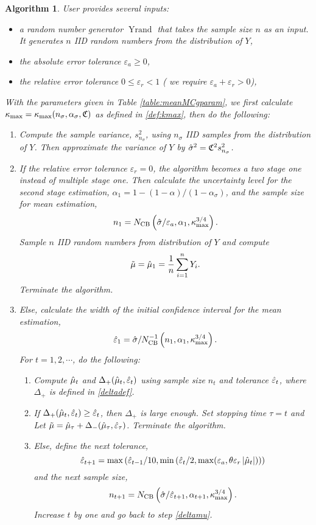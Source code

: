 \documentclass{iitthesis}
\DeclareMathOperator{\Yrand}{Yrand}
\newtheorem{algorithm}[theorem]{Algorithm}
\theoremstyle{definition}
\begin{document}
\begin{algorithm}\label{alg:meanMCg} 
User provides several inputs:
\begin{itemize}
\item a random number generator $\Yrand$ that takes the sample size $n$ as an input. It generates $n$ IID random numbers from the distribution of $Y$,
\item the absolute error tolerance $\varepsilon_a \geq 0$,
\item the relative error tolerance $0 \leq \varepsilon_r <1$ ( we require $\varepsilon_a+\varepsilon_r >0$),
\end{itemize}
With the parameters given in Table \ref{table:meanMCgparam}, we first calculate $\kappa_{\max}=\kappa_{\max}(n_\sigma,\alpha_\sigma,\mathfrak{C})$ as defined in \eqref{def:kmax}, then do the following:
\begin{enumerate}
\item Compute the sample variance, $s^2_{n_{\sigma}}$, using $n_\sigma$ IID samples from the distribution of $Y$. Then approximate the variance of $Y$ by $\hat{\sigma}^2 = \mathfrak{C}^2 s^2_{n_\sigma}$. 
\item If the relative error tolerance $\varepsilon_r=0$, the algorithm becomes a two stage one instead of multiple stage one. Then calculate the uncertainty level for the second stage estimation, $\alpha_1 = 1-(1-\alpha)/(1-\alpha_\sigma)$, and the sample size for mean estimation,
$$n_1 = N_{\text{CB}}\left(\hat{\sigma}/\varepsilon_a,\alpha_1,\kappa_{\max}^{3/4}\right).$$ 
Sample $n$ IID random numbers from distribution of $Y$ and compute $$\tilde{\mu} =\hat{\mu}_1 = \frac1n\sum_{i=1}^nY_i.$$
Terminate the algorithm.
\item Else, calculate the width of the initial confidence interval for the mean estimation,
\begin{align}\label{eps1def}
\hat{\varepsilon}_1=\hat{\sigma} /N_{\text{CB}}^{-1}\left(n_1,\alpha_1,\kappa_{\max}^{3/4}\right).
\end{align}
For $t = 1,2,\cdots$, do the following:
\begin{enumerate}
\item \label{deltamu}Compute $\hat{\mu}_t$ and $\Delta_{+}(\hat{\mu}_t,\hat{\varepsilon}_t)$ using sample size $n_t$ and tolerance $\hat{\varepsilon}_t$, where $\Delta_{+}$ is defined in \eqref{deltadef}.
\item If $\Delta_{+}(\hat{\mu}_t,\hat{\varepsilon}_t) \geq  \hat{\varepsilon}_t$, then $\Delta_{+}$ is large enough. Set stopping time $\tau = t$ and Let $\tilde{\mu} = \hat{\mu}_{\tau}+\Delta_{-}(\hat{\mu}_\tau,\hat{\varepsilon}_\tau)$. Terminate the algorithm.
\item Else, define the next tolerance, $$\hat{\varepsilon}_{t+1} = \max \left ( \hat{\varepsilon}_{t-1}/10,\min\left(\hat{\varepsilon}_t/2, \max(\varepsilon_a,\theta\varepsilon_r\left \lvert \hat{\mu}_t \right \rvert)\right)\right)$$ and the next sample size, $$n_{t+1} = N_{\text{CB}}\left(\hat{\sigma}/\hat{\varepsilon}_{t+1},\alpha_{t+1},\kappa_{\max}^{3/4}\right).$$ Increase $t$ by one and go back to step \eqref{deltamu}. 
\end{enumerate}
\end{enumerate}
\end{algorithm}
\end{document}
